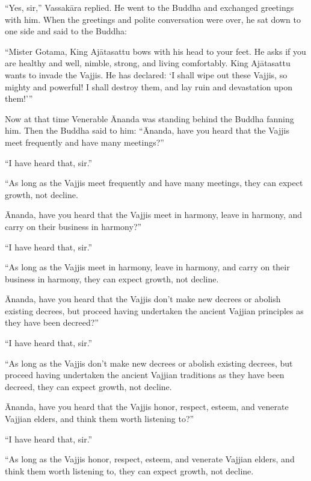 \documentclass[12pt,openany]{book}%
\begin{document}
“Yes, sir,” \textsanskrit{Vassakāra} replied. He went to the Buddha and exchanged greetings with him. When the greetings and polite conversation were over, he sat down to one side and said to the Buddha: 

“Mister Gotama, King \textsanskrit{Ajātasattu} bows with his head to your feet. He asks if you are healthy and well, nimble, strong, and living comfortably. King \textsanskrit{Ajātasattu} wants to invade the Vajjis. He has declared: ‘I shall wipe out these Vajjis, so mighty and powerful! I shall destroy them, and lay ruin and devastation upon them!’” 

Now at that time Venerable Ānanda was standing behind the Buddha fanning him. Then the Buddha said to him: “Ānanda, have you heard that the Vajjis meet frequently and have many meetings?” 

“I have heard that, sir.” 

“As long as the Vajjis meet frequently and have many meetings, they can expect growth, not decline. 

Ānanda, have you heard that the Vajjis meet in harmony, leave in harmony, and carry on their business in harmony?” 

“I have heard that, sir.” 

“As long as the Vajjis meet in harmony, leave in harmony, and carry on their business in harmony, they can expect growth, not decline. 

Ānanda, have you heard that the Vajjis don’t make new decrees or abolish existing decrees, but proceed having undertaken the ancient Vajjian principles as they have been decreed?” 

“I have heard that, sir.” 

“As long as the Vajjis don’t make new decrees or abolish existing decrees, but proceed having undertaken the ancient Vajjian traditions as they have been decreed, they can expect growth, not decline. 

Ānanda, have you heard that the Vajjis honor, respect, esteem, and venerate Vajjian elders, and think them worth listening to?” 

“I have heard that, sir.” 

“As long as the Vajjis honor, respect, esteem, and venerate Vajjian elders, and think them worth listening to, they can expect growth, not decline. 
\end{document}

